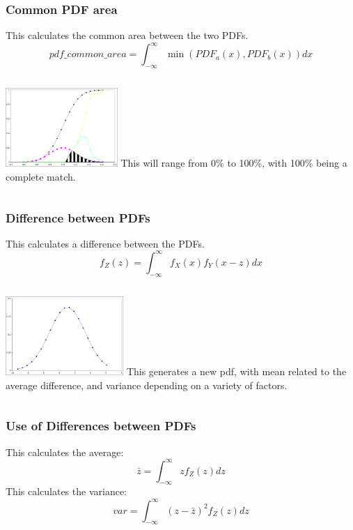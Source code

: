 \documentclass{beamer}
\begin{document}
\begin{frame}
  \frametitle{Common PDF area}
  This calculates the common area between the two PDFs.
  \begin{equation}
    pdf\_common\_area = \int_{-\infty}^{\infty}{\min(PDF_a(x),PDF_b(x))}dx
  \end{equation}
  \begin{columns}
    \includegraphics[height=3cm]{example_pdf_common}
    This will range from 0\% to 100\%, with 100\% being a complete match.
  \end{columns}
\end{frame}


\begin{frame}
  \frametitle{Difference between PDFs}
  This calculates a difference between the PDFs.
  \begin{equation}
    f_Z(z) = \int_{-\infty}^{\infty}f_X(x)f_Y(x-z)dx
  \end{equation}
  \begin{columns}
    \includegraphics[height=3cm]{f_z}
    This generates a new pdf, with mean related
    to the average difference, and variance depending on a variety of
    factors.
  \end{columns}
\end{frame}

\begin{frame}
  \frametitle{Use of Differences between PDFs}
  This calculates the average:
  \begin{equation}
    \bar{z} = \int_{-\infty}^{\infty}{z f_Z(z)dz}
  \end{equation}
  This calculates the variance:
  \begin{equation}
    var = \int_{-\infty}^{\infty}{(z-\bar{z})^2 f_Z(z)dz}
  \end{equation}
\end{frame}
\end{document}
